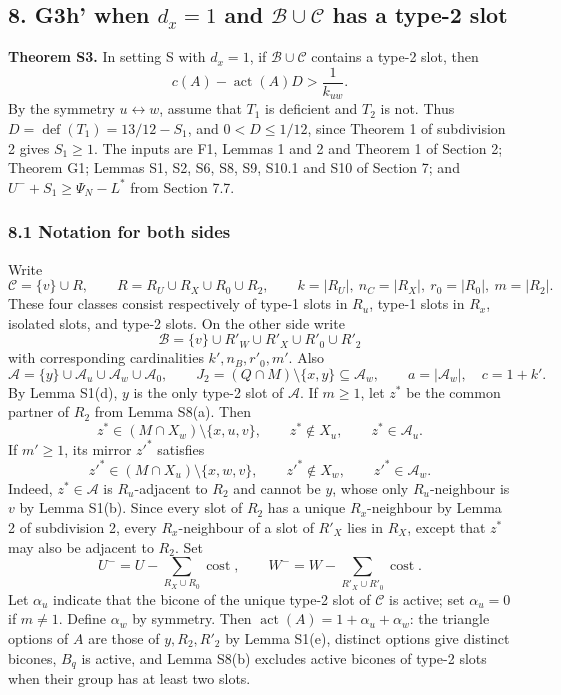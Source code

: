 \subsection*{8. G3h' when $d_x=1$ and $\mathcal B\cup\mathcal C$ has a type-2 slot}

\textbf{Theorem S3.} In setting S with $d_x=1$, if $\mathcal B\cup\mathcal C$ contains a type-2 slot, then
\[
 c(A)-\operatorname{act}(A)D>\frac1{k_{uw}}.
\]
By the symmetry $u\leftrightarrow w$, assume that $T_1$ is deficient and $T_2$ is not. Thus
$D=\operatorname{def}(T_1)=13/12-S_1$, and $0<D\le1/12$, since Theorem 1 of subdivision 2 gives $S_1\ge1$.
The inputs are F1, Lemmas 1 and 2 and Theorem 1 of Section 2; Theorem G1; Lemmas S1, S2, S6, S8, S9, S10.1 and S10 of Section 7; and $U^-+S_1\ge\Psi_N-L^*$ from Section 7.7.

\subsubsection*{8.1 Notation for both sides}
Write
\[
 \mathcal C=\{v\}\cup R,\qquad R=R_U\cup R_X\cup R_0\cup R_2,
 \qquad k=|R_U|,\ n_C=|R_X|,\ r_0=|R_0|,\ m=|R_2|.
\]
These four classes consist respectively of type-1 slots in $R_u$, type-1 slots in $R_x$, isolated slots, and type-2 slots. On the other side write
\[
 \mathcal B=\{v\}\cup R'_W\cup R'_X\cup R'_0\cup R'_2
\]
with corresponding cardinalities $k',n_B,r'_0,m'$. Also
\[
 \mathcal A=\{y\}\cup\mathcal A_u\cup\mathcal A_w\cup\mathcal A_0,
 \qquad J_2=(Q\cap M)\setminus\{x,y\}\subseteq\mathcal A_w,
 \qquad a=|\mathcal A_w|,\quad c=1+k'.
\]
By Lemma S1(d), $y$ is the only type-2 slot of $\mathcal A$.
If $m\ge1$, let $z^*$ be the common partner of $R_2$ from Lemma S8(a). Then
\[
 z^*\in(M\cap X_w)\setminus\{x,u,v\},\qquad z^*\notin X_u,
 \qquad z^*\in\mathcal A_u.
\]
If $m'\ge1$, its mirror $z'^*$ satisfies
\[
 z'^*\in(M\cap X_u)\setminus\{x,w,v\},\qquad z'^*\notin X_w,
 \qquad z'^*\in\mathcal A_w.
\]
Indeed, $z^*\in\mathcal A$ is $R_u$-adjacent to $R_2$ and cannot be $y$, whose only $R_u$-neighbour is $v$ by Lemma S1(b). Since every slot of $R_2$ has a unique $R_x$-neighbour by Lemma 2 of subdivision 2, every $R_x$-neighbour of a slot of $R'_X$ lies in $R_X$, except that $z^*$ may also be adjacent to $R_2$. Set
\[
 U^-=U-\sum_{R_X\cup R_0}\operatorname{cost},\qquad
 W^-=W-\sum_{R'_X\cup R'_0}\operatorname{cost}.
\]
Let $\alpha_u$ indicate that the bicone of the unique type-2 slot of $\mathcal C$ is active; set $\alpha_u=0$ if $m\ne1$. Define $\alpha_w$ by symmetry. Then
$\operatorname{act}(A)=1+\alpha_u+\alpha_w$: the triangle options of $A$ are those of $y,R_2,R'_2$ by Lemma S1(e), distinct options give distinct bicones, $B_q$ is active, and Lemma S8(b) excludes active bicones of type-2 slots when their group has at least two slots.


